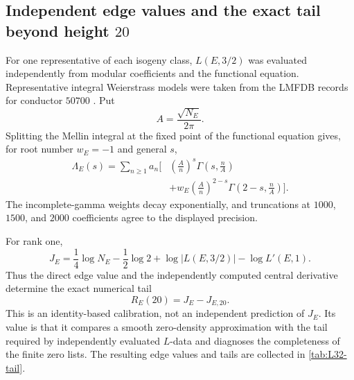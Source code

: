 \documentclass[11pt,reqno]{amsart}
\theoremstyle{remark}
\begin{document}
\subsection{Independent edge values and the exact tail beyond height $20$}

For one representative of each isogeny class, $L(E,3/2)$ was evaluated independently from modular coefficients and the functional equation.  Representative integral Weierstrass models were taken from the LMFDB records for conductor $50700$ \cite{LMFDB}.  Put
\begin{equation}
  A=\frac{\sqrt{N_E}}{2\pi}.
\end{equation}
Splitting the Mellin integral at the fixed point of the functional equation gives, for root number $w_E=-1$ and general $s$,
\begin{equation}
\begin{split}
  \Lambda_E(s)=\sum_{n\ge1}a_n\Bigg[
  &\left(\frac{A}{n}\right)^s
  \Gamma\!\left(s,\frac{n}{A}\right)\\
  &+w_E\left(\frac{A}{n}\right)^{2-s}
  \Gamma\!\left(2-s,\frac{n}{A}\right)
  \Bigg].
\end{split}
  \label{eq:incomplete-gamma-L}
\end{equation}
The incomplete-gamma weights decay exponentially, and truncations at $1000$, $1500$, and $2000$ coefficients agree to the displayed precision.

For rank one,
\begin{equation}
  J_E=\frac14\log N_E-\frac12\log2
  +\log|L(E,3/2)|-\log L'(E,1).
  \label{eq:J-from-independent-L32}
\end{equation}
Thus the direct edge value and the independently computed central derivative determine the exact numerical tail
\begin{equation}
  R_E(20)=J_E-J_{E,20}.
\end{equation}
This is an identity-based calibration, not an independent prediction of $J_E$.  Its value is that it compares a smooth zero-density approximation with the tail required by independently evaluated $L$-data and diagnoses the completeness of the finite zero lists.  The resulting edge values and tails are collected in \cref{tab:L32-tail}.
\end{document}
